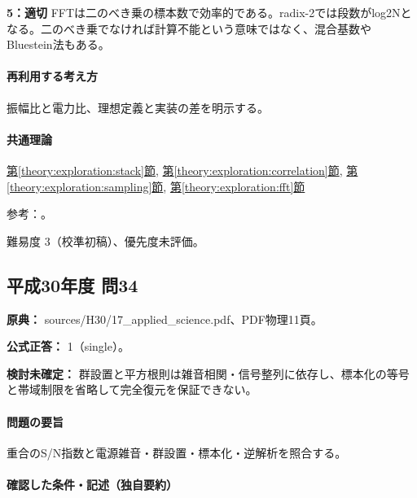 \noindent\textbf{5：適切} FFTは二のべき乗の標本数で効率的である。radix-2では段数がlog2Nとなる。二のべき乗でなければ計算不能という意味ではなく、混合基数やBluestein法もある。\par

\paragraph{再利用する考え方} 振幅比と電力比、理想定義と実装の差を明示する。

\paragraph{共通理論} \hyperref[theory:exploration:stack]{第\ref*{theory:exploration:stack}節}, \hyperref[theory:exploration:correlation]{第\ref*{theory:exploration:correlation}節}, \hyperref[theory:exploration:sampling]{第\ref*{theory:exploration:sampling}節}, \hyperref[theory:exploration:fft]{第\ref*{theory:exploration:fft}節}

\par 参考：\cite{mit_signals2010,mit_moving2012,scipy_notch,scipy_fft,usgs_processing2000,scipy_coherence}。

\par 難易度 3（校準初稿）、優先度未評価。

\subsection{平成30年度 問34}
\label{q:h30-reg-applied-34}

\noindent\textbf{原典：} sources/H30/17\_applied\_science.pdf、PDF物理11頁。

\textbf{公式正答：} 1（single）。

\par\textbf{検討未確定：} 群設置と平方根則は雑音相関・信号整列に依存し、標本化の等号と帯域制限を省略して完全復元を保証できない。

\paragraph{問題の要旨} 重合のS/N指数と電源雑音・群設置・標本化・逆解析を照合する。

\paragraph{確認した条件・記述（独自要約）}\mbox{}\par

